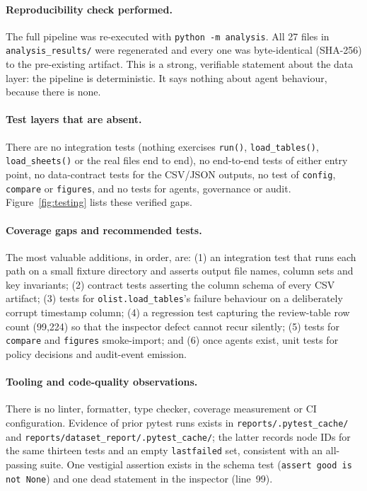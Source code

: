 \documentclass[11pt,a4paper]{article}
\newcommand{\code}[1]{\texttt{#1}}
\begin{document}
\paragraph{Reproducibility check performed.} The full pipeline was re-executed with \code{python -m analysis}. All 27 files in \code{analysis\_results/} were regenerated and every one was byte-identical (SHA-256) to the pre-existing artifact. This is a strong, verifiable statement about the data layer: the pipeline is deterministic. It says nothing about agent behaviour, because there is none.

\paragraph{Test layers that are absent.} There are no integration tests (nothing exercises \code{run()}, \code{load\_tables()}, \code{load\_sheets()} or the real files end to end), no end-to-end tests of either entry point, no data-contract tests for the CSV/JSON outputs, no test of \code{config}, \code{compare} or \code{figures}, and no tests for agents, governance or audit. Figure~\ref{fig:testing} lists these verified gaps.

\paragraph{Coverage gaps and recommended tests.} The most valuable additions, in order, are: (1) an integration test that runs each path on a small fixture directory and asserts output file names, column sets and key invariants; (2) contract tests asserting the column schema of every CSV artifact; (3) tests for \code{olist.load\_tables}'s failure behaviour on a deliberately corrupt timestamp column; (4) a regression test capturing the review-table row count (99{,}224) so that the inspector defect cannot recur silently; (5) tests for \code{compare} and \code{figures} smoke-import; and (6) once agents exist, unit tests for policy decisions and audit-event emission.

\paragraph{Tooling and code-quality observations.} There is no linter, formatter, type checker, coverage measurement or CI configuration. Evidence of prior pytest runs exists in \code{reports/.pytest\_cache/} and \code{reports/dataset\_report/.pytest\_cache/}; the latter records node IDs for the same thirteen tests and an empty \code{lastfailed} set, consistent with an all-passing suite. One vestigial assertion exists in the schema test (\code{assert good is not None}) and one dead statement in the inspector (line~99).
\end{document}
